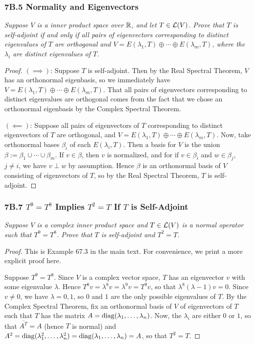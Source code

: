 \documentclass{article}
\begin{document}
\subsubsection*{7B.5 Normality and Eigenvectors}
\textit{Suppose $V$ is a inner product space over $\mathbb R$, and let $T\in \mathcal L(V)$. Prove that $T$ is self-adjoint if and only if all pairs of eigenvectors corresponding to distinct eigenvalues of $T$ are orthogonal and $V = E(\lambda_1, T)\oplus \cdots \oplus E(\lambda_m, T)$, where the $\lambda_i$ are distinct eigenvalues of $T$.}
\begin{proof}
$(\implies)$: Suppose $T$ is self-adjoint. Then by the Real Spectral Theorem, $V$ has an orthonormal eigenbasis, so we immediately have $V = E(\lambda_1, T)\oplus \cdots \oplus E(\lambda_m, T)$. That all pairs of eigenvectors corresponding to distinct eigenvalues are orthogonal comes from the fact that we chose an orthonormal eigenbasis by the Complex Spectral Theorem.

$(\impliedby)$: Suppose all pairs of eigenvectors of $T$ corresponding to distinct eigenvectors of $T$ are orthogonal, and $V = E(\lambda_1, T) \oplus \cdots \oplus E(\lambda_m, T)$. Now, take orthonormal bases $\beta_i$ of each $E(\lambda_i, T)$. Then a basis for $V$ is the union $\beta := \beta_1 \cup \cdots \cup\beta_m$. If $v\in\beta$, then $v$ is normalized, and for if $v\in \beta_i$ and $w\in \beta_j$, $j\neq i$, we have $v\perp w$ by assumption. Hence $\beta$ is an orthonormal basis of $V$ consisting of eigenvectors of $T$, so by the Real Spectral Theorem, $T$ is self-adjoint.
\end{proof}
\newpage
\subsubsection*{7B.7 $T^9 = T^8$ Implies $T^2 = T$ If $T$ is Self-Adjoint}
\textit{Suppose $V$ is a complex inner product space and $T\in\mathcal L(V)$ is a normal operator such that $T^9 = T^8$. Prove that $T$ is self-adjoint and $T^2 = T$.}
\begin{proof}
This is Example 67.3 in the main text. For convenience, we print a more explicit proof here.

Suppose $T^9 = T^8$. Since $V$ is a complex vector space, $T$ has an eigenvector $v$ with some eigenvalue $\lambda$. Hence $T^8v = \lambda^8 v = \lambda^9 v = T^9v$, so that $\lambda^8(\lambda - 1)v = 0$. Since $v\neq 0$, we have $\lambda = 0, 1$, so $0$ and $1$ are the only possible eigenvalues of $T$. By the Complex Spectral Theorem, fix an orthonormal basis of $V$ of eigenvectors of $T$ such that $T$ has the matrix $A = \operatorname{diag}(\lambda_1, \ldots, \lambda_n)$. Now, the $\lambda_i$ are either $0$ or $1$, so that $\overline{A^T} = A$ (hence $T$ is normal) and $A^2 = \operatorname{diag}(\lambda_1^2, \ldots, \lambda_n^2) = \operatorname{diag}(\lambda_1, \ldots, \lambda_n) = A$, so that $T^2 = T$.
\end{proof}
\end{document}
